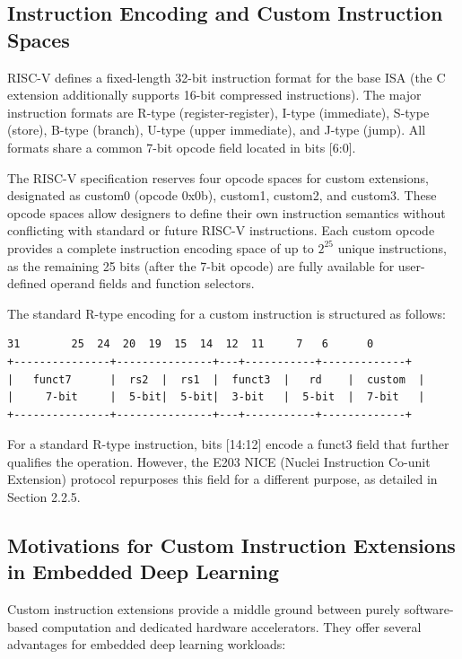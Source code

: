 \subsection{Instruction Encoding and Custom Instruction Spaces}

RISC-V defines a fixed-length 32-bit instruction format for the base ISA (the C extension additionally supports 16-bit compressed instructions). The major instruction formats are R-type (register-register), I-type (immediate), S-type (store), B-type (branch), U-type (upper immediate), and J-type (jump). All formats share a common 7-bit opcode field located in bits [6:0].


The RISC-V specification reserves four opcode spaces for custom extensions, designated as custom0 (opcode 0x0b), custom1, custom2, and custom3. These opcode spaces allow designers to define their own instruction semantics without conflicting with standard or future RISC-V instructions. Each custom opcode provides a complete instruction encoding space of up to $2^{25}$ unique instructions, as the remaining 25 bits (after the 7-bit opcode) are fully available for user-defined operand fields and function selectors.


The standard R-type encoding for a custom instruction is structured as follows:


\begin{lstlisting}[style=ascii]
31        25  24  20  19  15  14  12  11     7   6      0
+---------------+---------------+---+-----------+-------------+
|   funct7      |  rs2  |  rs1  |  funct3  |   rd    |  custom  |
|     7-bit     |  5-bit|  5-bit|  3-bit   |  5-bit  |  7-bit   |
+---------------+---------------+---+-----------+-------------+
\end{lstlisting}

For a standard R-type instruction, bits [14:12] encode a funct3 field that further qualifies the operation. However, the E203 NICE (Nuclei Instruction Co-unit Extension) protocol repurposes this field for a different purpose, as detailed in Section 2.2.5.


\subsection{Motivations for Custom Instruction Extensions in Embedded Deep Learning}

Custom instruction extensions provide a middle ground between purely software-based computation and dedicated hardware accelerators. They offer several advantages for embedded deep learning workloads:


